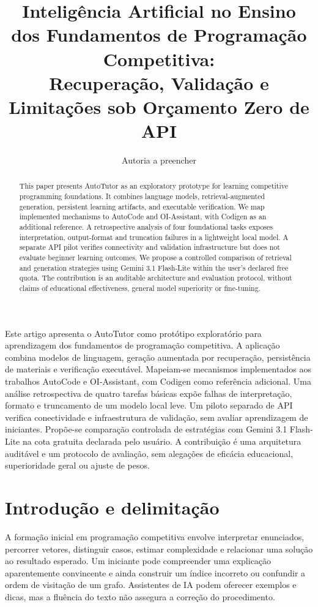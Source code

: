 \documentclass[12pt]{article}
\title{Inteligência Artificial no Ensino dos Fundamentos de Programação Competitiva:\\Recuperação, Validação e Limitações sob Orçamento Zero de API}
\author{Autoria a preencher\inst{1}}
\begin{document}
\maketitle
\begin{abstract}
This paper presents AutoTutor as an exploratory prototype for learning competitive programming foundations. It combines language models, retrieval-augmented generation, persistent learning artifacts, and executable verification. We map implemented mechanisms to AutoCode and OI-Assistant, with Codigen as an additional reference. A retrospective analysis of four foundational tasks exposes interpretation, output-format and truncation failures in a lightweight local model. A separate API pilot verifies connectivity and validation infrastructure but does not evaluate beginner learning outcomes. We propose a controlled comparison of retrieval and generation strategies using Gemini 3.1 Flash-Lite within the user's declared free quota. The contribution is an auditable architecture and evaluation protocol, without claims of educational effectiveness, general model superiority or fine-tuning.
\end{abstract}
\begin{resumo}
Este artigo apresenta o AutoTutor como protótipo exploratório para aprendizagem dos fundamentos de programação competitiva. A aplicação combina modelos de linguagem, geração aumentada por recuperação, persistência de materiais e verificação executável. Mapeiam-se mecanismos implementados aos trabalhos AutoCode e OI-Assistant, com Codigen como referência adicional. Uma análise retrospectiva de quatro tarefas básicas expõe falhas de interpretação, formato e truncamento de um modelo local leve. Um piloto separado de API verifica conectividade e infraestrutura de validação, sem avaliar aprendizagem de iniciantes. Propõe-se comparação controlada de estratégias com Gemini 3.1 Flash-Lite na cota gratuita declarada pelo usuário. A contribuição é uma arquitetura auditável e um protocolo de avaliação, sem alegações de eficácia educacional, superioridade geral ou ajuste de pesos.
\end{resumo}

\section{Introdução e delimitação}
A formação inicial em programação competitiva envolve interpretar enunciados, percorrer vetores, distinguir casos, estimar complexidade e relacionar uma solução ao resultado esperado. Um iniciante pode compreender uma explicação aparentemente convincente e ainda construir um índice incorreto ou confundir a ordem de visitação de um grafo. Assistentes de IA podem oferecer exemplos e dicas, mas a fluência do texto não assegura a correção do procedimento.
\end{document}

